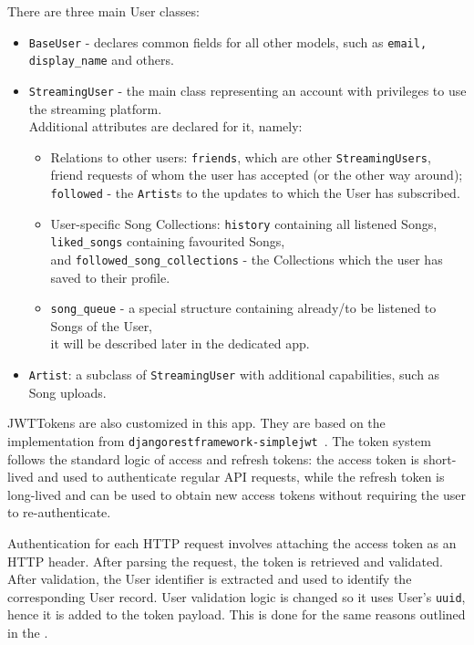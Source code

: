 There are three main User classes:
\begin{itemize}
    \item \texttt{BaseUser} - declares common fields for all other models, such as \texttt{email, display\_name} and others.
    \item \texttt{StreamingUser} - the main class representing an account with privileges to use the streaming platform.\\
    Additional attributes are declared for it, namely:
    \begin{itemize}
        \item Relations to other users: \texttt{friends}, which are other \texttt{StreamingUsers},\\
        friend requests of whom the user has accepted (or the other way around);\\
        \texttt{followed} - the \texttt{Artist}s to the updates to which the User has subscribed.

        \item User-specific Song Collections: \texttt{history} containing all listened Songs,\\
        \texttt{liked\_songs} containing favourited Songs,\\
        and \texttt{followed\_song\_collections} - the Collections which the user has saved to their profile.

        \item \texttt{song\_queue} - a special structure containing already/to be listened to Songs of the User,\\
        it will be described later in the dedicated app.
    \end{itemize}
    \item \texttt{Artist}: a subclass of \texttt{StreamingUser} with additional capabilities, such as Song uploads.
\end{itemize}

JWTTokens are also customized in this app.
They are based on the implementation from \texttt{djangorestframework-simplejwt}~\cite{simplejwt}.
The token system follows the standard logic of access and refresh tokens:
the access token is short-lived and used to authenticate regular API requests,
while the refresh token is long-lived and can be used to obtain new access tokens without requiring
the user to re-authenticate.

Authentication for each HTTP request involves attaching the access token as an HTTP  header.
After parsing the request, the token is retrieved and validated.
After validation, the User identifier is extracted and used to identify the corresponding User record.
User validation logic is changed so it uses User's \texttt{uuid}, hence it is added to the token payload.
This is done for the same reasons outlined in the .

